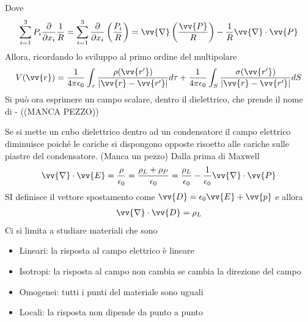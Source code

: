 \documentclass[a4paper, oneside]{article}
\begin{document}
Dove
\begin{gather*}
    \sum_{i = 1}^{3} P_i \frac{\partial }{\partial x_i}  \frac{1}{R} =    \sum_{i = 1}^{3} \frac{\partial }{\partial x_i} \left(\frac{P_i}{R}\right)  = \vv{\nabla}\left(\frac{\vv{P} }{R}\right)  - \frac{1}{R} \vv{\nabla} \cdot \vv{P}  
\end{gather*}
Allora, ricordando lo sviluppo al primo ordine del multipolare 
\begin{gather*}
    V(\vv{r} ) = \frac{1}{4\pi\epsilon_0} \int_{\tau} \frac{\rho(\vv{r'} )}{\left| \vv{r} - \vv{r'}   \right| } d\tau + \frac{1}{4\pi\epsilon_0} \int_{S} \frac{\sigma(\vv{r'} )}{\left| \vv{r} - \vv{r'}   \right| } dS  
\end{gather*}
Si può ora esprimere un campo scalare, dentro il dielettrico, che prende il nome di - ((MANCA PEZZO))


Se si mette un cubo dielettrico dentro ad un condensatore 
il campo elettrico diminuisce poiché le cariche si dispongono 
opposte risoetto alle cariche sulle piastre del condensatore. 
(Manca un pezzo)
Dalla prima di Maxwell
\begin{gather*}
    \vv{\nabla} \cdot \vv{E} = \frac{\rho}{\epsilon_0} = \frac{\rho_L + \rho_P}{\epsilon_0} = \frac{\rho_L}{\epsilon_0} - \frac{1}{\epsilon_0} \vv{\nabla} \cdot \vv{P}    
\end{gather*}
SI definisce il vettore spostamento come $\vv{D} = \epsilon_0 \vv{E} + \vv{p}  $ e 
allora 
\begin{align}
    \vv{\nabla} \cdot \vv{D} = \rho_L  
\end{align}   
Ci si limita a studiare materiali che sono 
\begin{itemize}
    \item Lineari: la risposta al campo elettrico è lineare
    \item Isotropi: la risposta al campo non cambia se cambia la direzione del campo
    \item Omogenei: tutti i punti del materiale sono uguali
    \item Locali: la risposta non dipende da punto a punto
\end{itemize}
\end{document}
